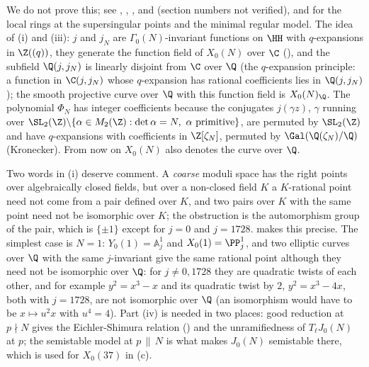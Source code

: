 We do not prove this; see \cite[Sections 6.7, 7.2]{Shimura71}, \cite[Sections 7.7, 8.2 to 8.6]{DiamondShurman}, \cite[Sections 8 and 9]{DiamondIm},
\cite{DeligneRapoport73} and \cite{KatzMazur85} (section numbers not verified), and \cite{Edixhoven90} for the local rings at the supersingular points and the
minimal regular model. The idea of (i) and (iii): $j$ and $j_N$ are $\Gamma_0(N)$-invariant
functions on $\HH$ with $q$-expansions in $\Z((q))$, they generate the function field of $X_0(N)$ over $\C$ (), and the subfield
$\Q(j,j_N)$ is linearly disjoint from $\C$ over $\Q$ (the $q$-expansion principle: a function in $\C(j,j_N)$ whose $q$-expansion has rational
coefficients lies in $\Q(j,j_N)$); the smooth projective curve over $\Q$ with this function field is $X_0(N)_\Q$. The polynomial $\Phi_N$ has integer
coefficients because the conjugates $j(\gamma z)$, $\gamma$ running over $\SL_2(\Z)\backslash\{\alpha\in M_2(\Z):\det\alpha=N,\ \alpha\text{ primitive}\}$,
are permuted by $\SL_2(\Z)$ and have $q$-expansions with coefficients in $\Z[\zeta_N]$, permuted by $\Gal(\Q(\zeta_N)/\Q)$ (Kronecker). From now on
$X_0(N)$ also denotes the curve over $\Q$.

Two words in (i) deserve comment. A \emph{coarse} moduli space has the right points over algebraically closed fields, but over a non-closed field $K$ a $K$-rational point need
not come from a pair defined over $K$, and two pairs over $K$ with the same point need not be isomorphic over $K$; the obstruction is the automorphism group of the pair, which is
$\{\pm1\}$ except for $j=0$ and $j=1728$.  makes this precise. The simplest case is $N=1$: $Y_0(1)=\mathbb A^1_j$ and $X_0(1)=\PP^1_j$, and two
elliptic curves over $\Q$ with the same $j$-invariant give the same rational point although they need not be isomorphic over $\Q$: for $j\ne0,1728$ they are quadratic
twists of each other, and for example $y^2=x^3-x$ and its quadratic twist by $2$, $y^2=x^3-4x$, both with $j=1728$, are not isomorphic over $\Q$ (an isomorphism would have
to be $x\mapsto u^2x$ with $u^4=4$). Part (iv) is needed in two places: good reduction at $p\nmid N$ gives the Eichler-Shimura relation
() and the unramifiedness of $T_\ell J_0(N)$ at $p$; the semistable model at $p\,\|\,N$ is what makes $J_0(N)$ semistable there, which is used for
$X_0(37)$ in (c).

